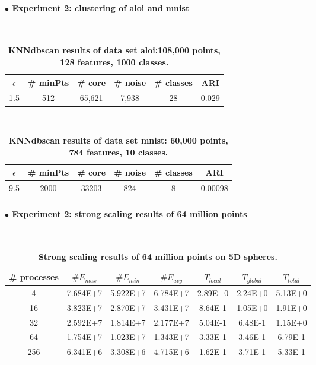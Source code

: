 \documentclass[12pt]{article}
\begin{document}
\clearpage
\paragraph{$\bullet$ \large{Experiment 2: clustering of aloi and mnist}}
$ $\newline
\renewcommand{\arraystretch}{1.7}
\begin{table}[h]
\centering
    \caption{\textbf{KNNdbscan results of data set aloi:108,000 points, 128 features, 1000 classes.} }
    \label{5Dweak}
\begin{tabular}{cccccc}
    \hline %
$\epsilon$ &\# minPts  &\# core   &\# noise &\# classes  &ARI\\
\hline\hline
1.5 &512  &65,621   &7,938   &28 &0.029\\
\hline
    \end{tabular}
\end{table}
$ $\newline
\renewcommand{\arraystretch}{1.7}
\begin{table}[h]
\centering
    \caption{\textbf{KNNdbscan results of data set mnist: 60,000 points, 784 features, 10 classes.} }
    \label{5Dweak}
\begin{tabular}{cccccc}
    \hline %
$\epsilon$ &\# minPts  &\# core   &\# noise &\# classes  &ARI\\
\hline\hline
9.5 &2000 &33203 &824 &8 &0.00098\\
\hline
    \end{tabular}
\end{table}

\clearpage
\paragraph{$\bullet$\large{ Experiment 2: strong scaling results of 64 million points}}
$ $\newline
\renewcommand{\arraystretch}{1.7}
\begin{table}[h]
\centering
    \caption{\textbf{Strong scaling results of 64 million points on 5D spheres.} }
	\label{64M5D}
\begin{tabular}{ccccccc}
    \hline %
\# processes  &$\# E_{max}$   &$\# E_{min}$ &$\# E_{avg}$  &$T_{local}$  &$T_{global}$  &$T_{total}$\\
\hline\hline
4  &7.684E+7   &5.922E+7   &6.784E+7  &2.89E+0  &2.24E+0    &5.13E+0\\
16  &3.823E+7   &2.870E+7   &3.431E+7 &8.64E-1  &1.05E+0    &1.91E+0\\
32   &2.592E+7   &1.814E+7   &2.177E+7 &5.04E-1 &6.48E-1    &1.15E+0\\
64  &1.754E+7   &1.023E+7   &1.343E+7   &3.33E-1    &3.46E-1    &6.79E-1\\
256  &6.341E+6   &3.308E+6   &4.715E+6 &1.62E-1 &3.71E-1    &5.33E-1\\
\hline
    \end{tabular}
\end{table}
\end{document}

